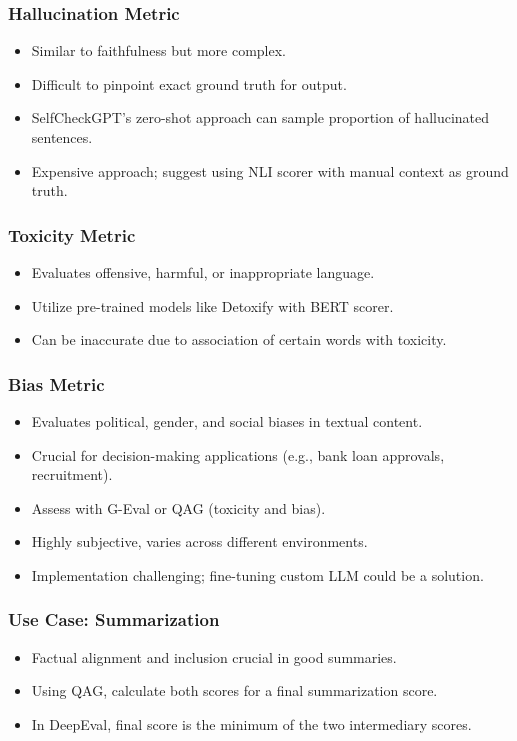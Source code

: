 \begin{frame}[fragile]\frametitle{Hallucination Metric}
  \begin{itemize}
    \item Similar to faithfulness but more complex.
    \item Difficult to pinpoint exact ground truth for output.
    \item SelfCheckGPT's zero-shot approach can sample proportion of hallucinated sentences.
    \item Expensive approach; suggest using NLI scorer with manual context as ground truth.
  \end{itemize}
\end{frame}

\begin{frame}[fragile]\frametitle{Toxicity Metric}
  \begin{itemize}
    \item Evaluates offensive, harmful, or inappropriate language.
    \item Utilize pre-trained models like Detoxify with BERT scorer.
    \item Can be inaccurate due to association of certain words with toxicity.
  \end{itemize}
\end{frame}

\begin{frame}[fragile]\frametitle{Bias Metric}
  \begin{itemize}
    \item Evaluates political, gender, and social biases in textual content.
    \item Crucial for decision-making applications (e.g., bank loan approvals, recruitment).
    \item Assess with G-Eval or QAG (toxicity and bias).
    \item Highly subjective, varies across different environments.
    \item Implementation challenging; fine-tuning custom LLM could be a solution.
  \end{itemize}
\end{frame}

\begin{frame}[fragile]\frametitle{Use Case: Summarization}
  \begin{itemize}
    \item Factual alignment and inclusion crucial in good summaries.
    \item Using QAG, calculate both scores for a final summarization score.
    \item In DeepEval, final score is the minimum of the two intermediary scores.
  \end{itemize}
\end{frame}

